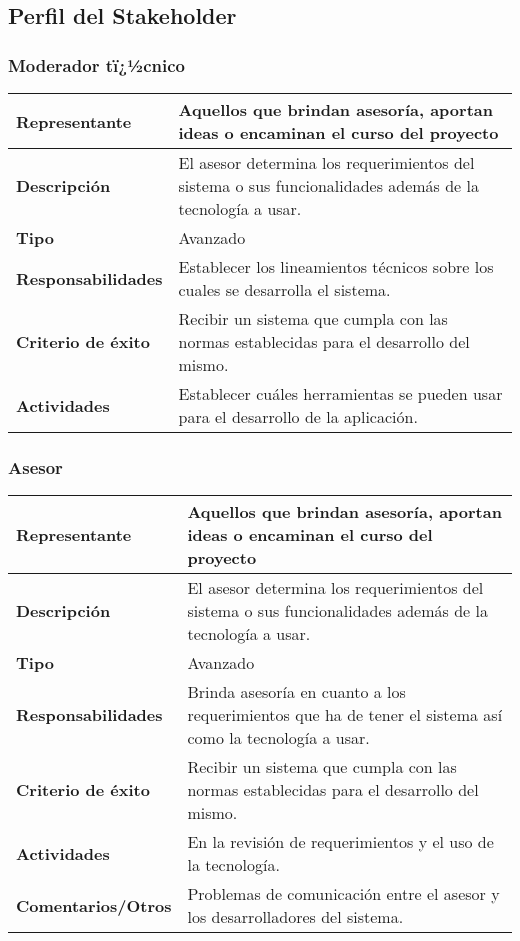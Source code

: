 \documentclass{article}
\begin{document}
	\subsection{Perfil del Stakeholder}
	\subsubsection{Moderador tï¿½cnico}
	\begin{center}
		\begin{tabular}{| p{} | p{}|}
		 \hline  %
		\raggedright
		\textbf{Representante} & Aquellos que brindan asesoría, aportan ideas o encaminan el curso del proyecto \\ \hline
		\textbf{Descripción} & El asesor determina los requerimientos del sistema o sus funcionalidades además de la tecnología a usar.\\ \hline
		\textbf{Tipo} & Avanzado \\ \hline
		\textbf{Responsabilidades} & Establecer los lineamientos técnicos sobre los cuales se desarrolla el sistema.\\ \hline
		\textbf{Criterio de éxito} & Recibir un sistema que cumpla con las normas establecidas para el desarrollo del mismo. 
		\\ \hline
		\textbf{Actividades} & Establecer cuáles herramientas se pueden usar para el desarrollo de la aplicación. \\ \hline
		\end{tabular}
	\end{center}

	\subsubsection{Asesor}
	\begin{center}
		\begin{tabular}{| p{} | p{}|}
		 \hline  %
		\raggedright
		\textbf{Representante} & Aquellos que brindan asesoría, aportan ideas o encaminan el curso del proyecto
		\\ \hline
		\textbf{Descripción} & El asesor determina los requerimientos del sistema o sus funcionalidades además de la tecnología a usar.\\ \hline
		\textbf{Tipo} & Avanzado \\ \hline
		\textbf{Responsabilidades} & Brinda asesoría en cuanto a los requerimientos que ha de tener el sistema así como la tecnología a usar.\\ \hline
		\textbf{Criterio de éxito} & Recibir un sistema que cumpla con las normas establecidas para el desarrollo del mismo. 
		\\ \hline
		\textbf{Actividades} & En la revisión de requerimientos y el uso de la tecnología. \\ \hline
		\textbf{Comentarios/Otros} & Problemas de comunicación entre el asesor y los desarrolladores del sistema. \\ \hline
		\end{tabular}
	\end{center}
\end{document}
